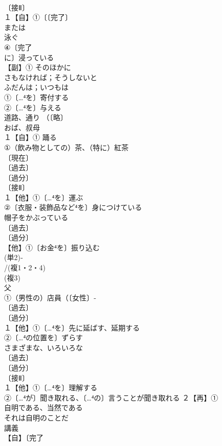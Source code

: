 \documentclass[8pt]{extreport}
\begin{document}
\begin{CJK}{UTF8}{min}
\\	〔接Ⅱ〕
\\	１【自】①〔〔完了〕
\\	または
\\	泳ぐ 
\\	④〔完了
\\	に〕浸っている
\\	【副】① そのほかに 
\\	さもなければ；そうしないと 
\\	ふだんは；いつもは 
\\	①〔…⁴を〕寄付する 
\\	②〔…⁴を〕与える
\\	道路、通り （〔略〕
\\	おば、叔母 
\\	１【自】① 踊る
\\	①（飲み物としての）茶、（特に）紅茶 
\\	〔現在〕
\\	〔過去〕
\\	〔過分〕
\\	〔接Ⅱ〕
\\	１【他】①〔…⁴を〕運ぶ 
\\	②〔衣服・装飾品など⁴を〕身につけている 
\\	帽子をかぶっている
\\	〔過去〕
\\	〔過分〕
\\	【他】①〔お金⁴を〕振り込む
\\	(単2)‐
\\	/(複1・2・4)
\\	(複3)
\\	父 
\\	①（男性の）店員（〔女性〕‐
\\	〔過去〕
\\	〔過分〕
\\	１【他】①〔…⁴を〕先に延ばす、延期する
\\	②〔…⁴の位置を〕ずらす 
\\	さまざまな、いろいろな
\\	〔過去〕
\\	〔過分〕
\\	〔接Ⅱ〕
\\	１【他】①〔…⁴を〕理解する 
\\	②〔…⁴が〕聞き取れる、〔…⁴の〕言うことが聞き取れる ２【再】①
\\	自明である、当然である 
\\	それは自明のことだ
\\	講義 
\\	【自】〔完了

\end{CJK}
\end{document}
